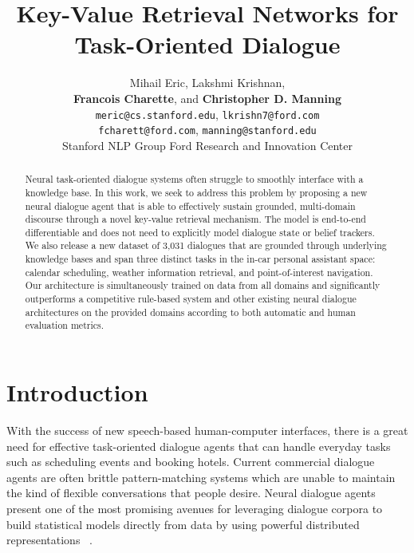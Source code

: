 \documentclass[11pt,a4paper]{article}
\title{Key-Value Retrieval Networks for Task-Oriented Dialogue}
\author{ Mihail Eric, Lakshmi Krishnan, \\\textbf{Francois Charette}, and \textbf{Christopher D. Manning}\\
{\tt meric@cs.stanford.edu}, {\tt lkrishn7@ford.com} \\
{\tt fcharett@ford.com}, {\tt manning@stanford.edu} \\
Stanford NLP Group \hspace{0.02in}
Ford Research and Innovation Center}
\date{}
\begin{document}
\maketitle

\begin{abstract}
  Neural task-oriented dialogue systems often struggle to smoothly interface with a knowledge base. In this work, we seek to address this problem by proposing a new neural dialogue agent that is able to effectively sustain grounded, multi-domain discourse through a novel key-value retrieval mechanism. The model is end-to-end differentiable and does not need to explicitly model dialogue state or belief trackers. We also release a new dataset of 3,031 dialogues that are grounded through underlying knowledge bases and span three distinct tasks in the in-car personal assistant space: calendar scheduling, weather information retrieval, and point-of-interest navigation. Our architecture is simultaneously trained on data from all domains and significantly outperforms a competitive rule-based system and other existing neural dialogue architectures on the provided domains according to both automatic and human evaluation metrics.
  
\end{abstract}


\section{Introduction}
  With the success of new speech-based human-computer interfaces, there is a great need for effective task-oriented dialogue agents that can handle everyday tasks such as scheduling events and booking hotels. Current commercial dialogue agents are often brittle pattern-matching systems which are unable to maintain the kind of flexible conversations that people desire. Neural dialogue agents present one of the most promising avenues for leveraging dialogue corpora to build statistical models directly from data by using powerful distributed representations ~\cite{Bordes:16, Wen:16, Dhingra:16}. 
\end{document}
